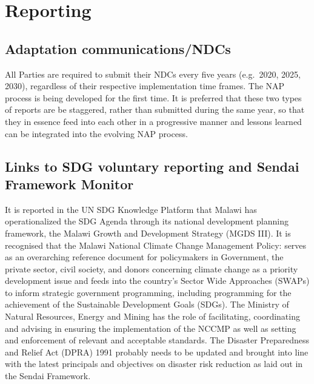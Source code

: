 \documentclass[
]{book}
\begin{document}
\hypertarget{reporting}{%
\chapter{Reporting}\label{reporting}}

\hypertarget{adaptation-communicationsndcs}{%
\section{Adaptation communications/NDCs}\label{adaptation-communicationsndcs}}

All Parties are required to submit their NDCs every five years (e.g.~2020, 2025, 2030), regardless of their respective implementation time frames. The NAP process is being developed for the first time. It is preferred that these two types of reports are be staggered, rather than submitted during the same year, so that they in essence feed into each other in a progressive manner and lessons learned can be integrated into the evolving NAP process.

\hypertarget{links-to-sdg-voluntary-reporting-and-sendai-framework-monitor}{%
\section{Links to SDG voluntary reporting and Sendai Framework Monitor}\label{links-to-sdg-voluntary-reporting-and-sendai-framework-monitor}}

It is reported in the UN SDG Knowledge Platform that Malawi has operationalized the SDG Agenda through its national development planning framework, the Malawi Growth and Development Strategy (MGDS III). It is recognised that the Malawi National Climate Change Management Policy: serves as an overarching reference document for policymakers in Government, the private sector, civil society, and donors concerning climate change as a priority development issue and feeds into the country's Sector Wide Approaches (SWAPs) to inform strategic government programming, including programming for the achievement of the Sustainable Development Goals (SDGs). The Ministry of Natural Resources, Energy and Mining has the role of facilitating, coordinating and advising in ensuring the implementation of the NCCMP as well as setting and enforcement of relevant and acceptable standards. The Disaster Preparedness and Relief Act (DPRA) 1991 probably needs to be updated and brought into line with the latest principals and objectives on disaster risk reduction as laid out in the Sendai Framework.
\end{document}
